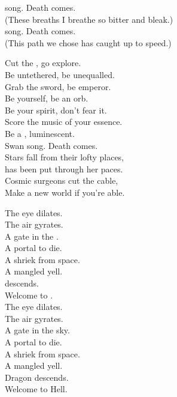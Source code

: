  song. Death comes. \\
(These breaths I breathe so bitter and bleak.) \\
 song. Death comes. \\
(This path we chose has caught up to speed.) \\


Cut the , go explore. \\
Be untethered, be unequalled. \\
Grab the sword, be emperor. \\
Be yourself, be an orb. \\
Be your spirit, don't fear it. \\
Score the music of your essence. \\
Be a , luminescent. \\
Swan song. Death comes. \\

Stars fall from their lofty places, \\
 has been put through her paces. \\
Cosmic surgeons cut the cable, \\
Make a new world if you're able. \\


The eye dilates. \\
The air gyrates. \\
A gate in the . \\
A portal to die. \\
A shriek from space. \\
A mangled yell. \\
 descends. \\
Welcome to . \\

The eye dilates. \\
The air gyrates. \\
A gate in the sky. \\
A portal to die. \\
A shriek from space. \\
A mangled yell. \\
Dragon descends. \\
Welcome to Hell. \\


